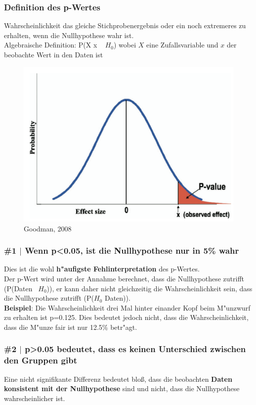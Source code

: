 \documentclass{beamer}
\begin{document}
\begin{frame}
	\frametitle{Definition des p-Wertes}
	Wahrscheinlichkeit das gleiche Stichprobenergebnis oder ein noch extremeres zu erhalten, wenn die Nullhypothese wahr ist.\\
	\vspace{1em}
	 Algebraische Definition: P(X \geq x \mid~ $H_0$) wobei $X$ eine Zufallsvariable und $x$ der beobachte Wert in den Daten ist 
\begin{figure}
\centering
\includegraphics[width=0.5\linewidth]{bell_curve}
\caption{{\footnotesize Goodman, 2008}}
\label{fig:bell_curve}
\end{figure}
\end{frame}

\begin{frame}
	\frametitle{\#1 $\mid$ Wenn p\textless0.05, ist die Nullhypothese nur in 5\% wahr}
	Dies ist die wohl \textbf{h"aufigste Fehlinterpretation} des p-Wertes. \\
	\vspace{1em}
	Der p-Wert wird unter der Annahme berechnet, dass die Nullhypothese zutrifft (P(Daten \mid~$H_0$)), er kann daher nicht gleichzeitig die Wahrscheinlichkeit sein, dass die Nullhypothese zutrifft (P($H_0$ \mid Daten)).\\
	\vspace{1em}
	\textbf{Beispiel}: Die Wahrscheinlichkeit drei Mal hinter einander Kopf beim M"unzwurf zu erhalten ist p=0.125. Dies bedeutet jedoch nicht, dass die Wahrscheinlichkeit, dass die M"unze fair ist nur 12.5\% betr"agt.	
\end{frame}

\begin{frame}
	\frametitle{\#2 $\mid$ p\textgreater 0.05 bedeutet, dass es keinen Unterschied zwischen den Gruppen gibt}
	Eine nicht signifikante Differenz bedeutet blo\ss{}, dass die beobachten \textbf{Daten konsistent mit der Nullhypothese} sind und nicht, dass die Nullhypothese wahrscheinlicher ist.
\end{frame}
\end{document}
